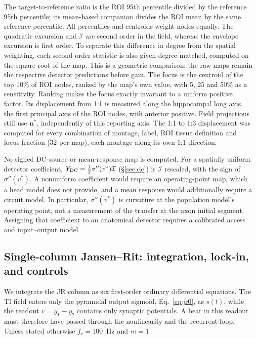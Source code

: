 \documentclass[11pt,a4paper]{article}
\newcommand{\Sig}{\sigma}
\begin{document}
The target-to-reference ratio is the ROI 95th percentile divided by the reference
95th percentile; its mean-based companion divides the ROI mean by the same
reference percentile. All percentiles and centroids weight nodes equally.
The quadratic excursion and $\mathcal I$ are second order in the field, whereas
the envelope excursion is first order. To separate this difference in degree
from the spatial weighting, each second-order statistic is also given
degree-matched, computed on the square root of the map. This is a geometric
comparison; the raw maps remain the respective detector predictions before gain.
The focus is the centroid of the top 10\% of ROI nodes,
ranked by the map's own value, with 5, 25 and 50\% as a sensitivity. Ranking makes the
focus exactly invariant to a uniform positive factor. Its displacement from 1:1 is
measured along the hippocampal long axis, the first principal axis of the ROI nodes,
with anterior positive. Field projections still use $\mathbf n^*$, independently
of this reporting axis. The 1:1 to 1:3 displacement was computed for every combination
of montage, label, ROI tissue definition and focus fraction (32 per map), each montage
along its own 1:1 direction.

No signed DC-source or mean-response map is computed. For a spatially uniform detector
coefficient, $Y_{\rm DC}=\tfrac12\Sig''(v^*)\mathcal I$ (\S\ref{sec:dc}) is
$\mathcal I$ rescaled, with the sign of $\Sig''(v^*)$. A nonuniform coefficient would
require an operating-point map, which a head model does not provide, and a mean
response would additionally require a circuit model. In particular,
$\Sig''(v^*)$ is curvature at the population model's operating point, not a
measurement of the transfer at the axon initial segment. Assigning that
coefficient to an anatomical detector requires a calibrated access and
input--output model.

\fi

\subsection{Single-column Jansen--Rit: integration, lock-in, and controls}\label{sec:jr-methods}
We integrate the JR column as six first-order ordinary differential equations. The TI field enters only the pyramidal output sigmoid, Eq.~\eqref{eq:jr0},
as $s(t)$, while the readout $v=y_1-y_2$ contains only synaptic potentials.
A beat in this readout must therefore have passed through the nonlinearity
and the recurrent loop. Unless stated otherwise $f_c=100$~Hz and $m=1$.
\end{document}

